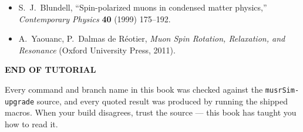 \begin{itemize}
  \item S.~J.~Blundell, ``Spin-polarized muons in condensed matter physics,'' \emph{Contemporary Physics} \textbf{40} (1999) 175--192.
  \item A.~Yaouanc, P.~Dalmas de R\'eotier, \emph{Muon Spin Rotation, Relaxation, and Resonance} (Oxford University Press, 2011).
\end{itemize}

\vspace{2em}
\begin{center}
{\sffamily\bfseries\footnotesize\color{eblue}END OF TUTORIAL}\par\vspace{0.4em}
{\small\color{muted}Every command and branch name in this book was checked against the \texttt{musrSim-upgrade} source, and every quoted result was produced by running the shipped macros. When your build disagrees, trust the source --- this book has taught you how to read it.\par}
\end{center}
